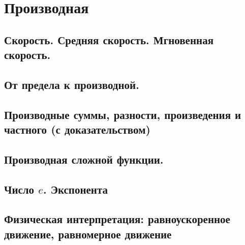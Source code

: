 \section{Производная}
\subsection{Скорость. Средняя скорость. Мгновенная скорость.}
\subsection{От предела к производной.}
\subsection{Производные суммы, разности, произведения и частного (с доказательством)}
\subsection{Производная сложной функции.}
\subsection{Число $e$. Экспонента}
\subsection{Физическая интерпретация: равноускоренное движение, равномерное движение}